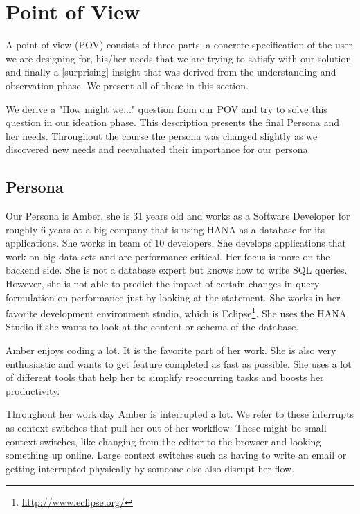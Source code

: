 
\section{Point of View} \label{sec:POINT_OF_VIEW}

A point of view (POV) consists of three parts: a concrete specification of the user we are designing for, his/her needs that we are trying to satisfy with our solution and finally a [surprising] insight that was derived from the understanding and observation phase. We present all of these in this section.

We derive a "How might we..." question from our POV and try to solve this question in our ideation phase. This description presents the final Persona and her needs. Throughout the course the persona was changed slightly as we discovered new needs and reevaluated their importance for our persona. 

\subsection{Persona}
\label{subsec:persona}

Our Persona is Amber, she is 31 years old and works as a Software Developer for roughly 6 years at a big company that is using HANA as a database for its applications. She works in team of 10 developers. She develops applications that work on big data sets and are performance critical. Her focus is more on the backend side. She is not a database expert but knows how to write SQL queries. However, she is not able to predict the impact of certain changes in query formulation on performance just by looking at the statement. She works in her favorite development environment studio, which is Eclipse\footnote{\url{http://www.eclipse.org/}}. She uses the HANA Studio if she wants to look at the content or schema of the database.

Amber enjoys coding a lot. It is the favorite part of her work. She is also very enthusiastic and wants to get feature completed as fast as possible. She uses a lot of different tools that help her to simplify reoccurring tasks and boosts her productivity.

Throughout her work day Amber is interrupted a lot. We refer to these interrupts as context switches that pull her out of her workflow. These might be small context switches, like changing from the editor to the browser and looking something up online. Large context switches such as having to write an email or getting interrupted physically by someone else also disrupt her flow.

